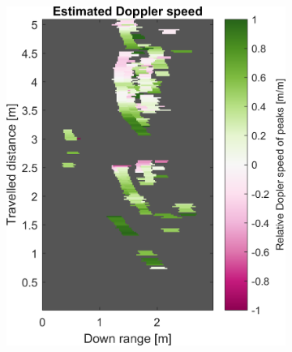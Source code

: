 \begin{figure}[htbp]
\begin{subfigure}[t]{0.475\linewidth}
        \includegraphics[width=\linewidth,max height=.475\textheight]{gfx/results/washroom_doppler.png}
    \end{subfigure}\bigskip\\
    \begin{subfigure}[t]{0.475\linewidth}
        \centering

\end{subfigure}
\end{figure}
